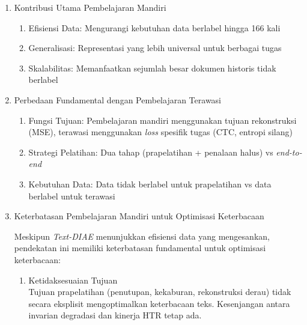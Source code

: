 \documentclass[12pt,a4paper]{article}
\begin{document}
\begin{enumerate}[leftmargin=*, labelindent=0pt, itemsep=1ex, topsep=0pt]

\item Kontribusi Utama Pembelajaran Mandiri

\begin{enumerate}[leftmargin=1.5em, labelsep=0.5em, itemindent=0pt, label=\alph*., topsep=0pt, parsep=0pt, itemsep=0pt]
      \item Efisiensi Data: Mengurangi kebutuhan data berlabel hingga 166 kali
      \item Generalisasi: Representasi yang lebih universal untuk berbagai tugas
      \item Skalabilitas: Memanfaatkan sejumlah besar dokumen historis tidak berlabel
\end{enumerate}

\item Perbedaan Fundamental dengan Pembelajaran Terawasi

\begin{enumerate}[leftmargin=1.5em, labelsep=0.5em, itemindent=0pt, label=\alph*., topsep=0pt, parsep=0pt, itemsep=0pt]
      \item Fungsi Tujuan: Pembelajaran mandiri menggunakan tujuan rekonstruksi (MSE), terawasi menggunakan \textit{loss} spesifik tugas (CTC, entropi silang)
      \item Strategi Pelatihan: Dua tahap (prapelatihan + penalaan halus) vs \textit{end-to-end}
      \item Kebutuhan Data: Data tidak berlabel untuk prapelatihan vs data berlabel untuk terawasi
\end{enumerate}

\item Keterbatasan Pembelajaran Mandiri untuk Optimisasi Keterbacaan

Meskipun \textit{Text-DIAE} menunjukkan efisiensi data yang mengesankan, pendekatan ini memiliki keterbatasan fundamental untuk optimisasi keterbacaan:

\begin{enumerate}[leftmargin=1.5em, labelsep=0.5em, itemindent=0pt, label=\alph*., topsep=0pt, parsep=0pt, itemsep=0pt]
      \item Ketidaksesuaian Tujuan \mbox{}\\[0.1em]
            Tujuan prapelatihan (penutupan, kekaburan, rekonstruksi derau) tidak secara eksplisit mengoptimalkan keterbacaan teks. Kesenjangan antara invarian degradasi dan kinerja HTR tetap ada.


\end{enumerate}
\end{enumerate}
\end{document}

